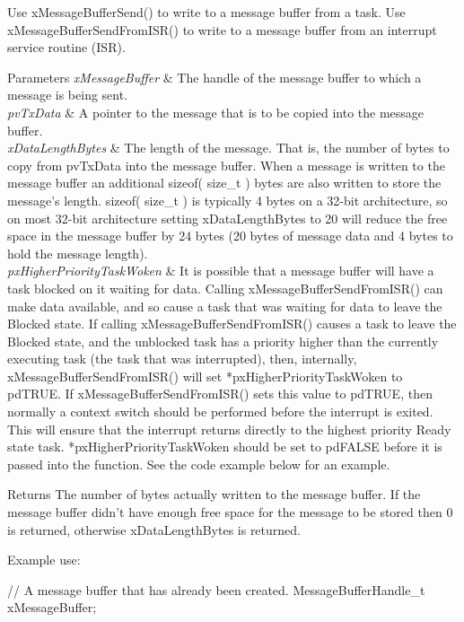 \begin{DoxyPre}
\begin{DoxyPre}   Use xMessageBufferSend() to write to a message buffer from a task.  Use
   xMessageBufferSendFromISR() to write to a message buffer from an interrupt
   service routine (ISR).\end{DoxyPre}
\end{DoxyPre}



\begin{DoxyPre}
\begin{DoxyPre}
\begin{DoxyParams}{Parameters}
{\em xMessageBuffer} & The handle of the message buffer to which a message is
   being sent.\\
\hline
{\em pvTxData} & A pointer to the message that is to be copied into the
   message buffer.\\
\hline
{\em xDataLengthBytes} & The length of the message.  That is, the number of
   bytes to copy from pvTxData into the message buffer.  When a message is
   written to the message buffer an additional sizeof( size\_t ) bytes are also
   written to store the message's length.  sizeof( size\_t ) is typically 4 bytes
   on a 32-bit architecture, so on most 32-bit architecture setting
   xDataLengthBytes to 20 will reduce the free space in the message buffer by 24
   bytes (20 bytes of message data and 4 bytes to hold the message length).\\
\hline
{\em pxHigherPriorityTaskWoken} & It is possible that a message buffer will
   have a task blocked on it waiting for data.  Calling
   xMessageBufferSendFromISR() can make data available, and so cause a task that
   was waiting for data to leave the Blocked state.  If calling
   xMessageBufferSendFromISR() causes a task to leave the Blocked state, and the
   unblocked task has a priority higher than the currently executing task (the
   task that was interrupted), then, internally, xMessageBufferSendFromISR()
   will set *pxHigherPriorityTaskWoken to pdTRUE.  If
   xMessageBufferSendFromISR() sets this value to pdTRUE, then normally a
   context switch should be performed before the interrupt is exited.  This will
   ensure that the interrupt returns directly to the highest priority Ready
   state task.  *pxHigherPriorityTaskWoken should be set to pdFALSE before it
   is passed into the function.  See the code example below for an example.\\
\hline
\end{DoxyParams}
\begin{DoxyReturn}{Returns}
The number of bytes actually written to the message buffer.  If the
   message buffer didn't have enough free space for the message to be stored
   then 0 is returned, otherwise xDataLengthBytes is returned.
\end{DoxyReturn}
Example use:

\begin{DoxyPre}
// A message buffer that has already been created.
MessageBufferHandle\_t xMessageBuffer;\end{DoxyPre}
\end{DoxyPre}
\end{DoxyPre}



